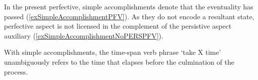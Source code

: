 In the present perfective, simple accomplishments denote that the eventuality has passed (\ref{exSimpleAccomplishmentPFV}). As they do not encode a resultant state, perfective aspect is not licensed in the complement of the persistive aspect auxiliary (\ref{exSimpleAccomplishmentNoPERSPFV}).

\begin{exe}
\ex\label{exSimpleAccomplishmentPFV}
\begin{xlist}


\end{xlist}
\ex\label{exSimpleAccomplishmentNoPERSPFV} \begin{xlist}
\end{xlist}
\end{exe}%

With simple accomplishments, the time-span verb phrase \lq take X time' unambiguously refers to the time that elapses before the culmination of the process.


